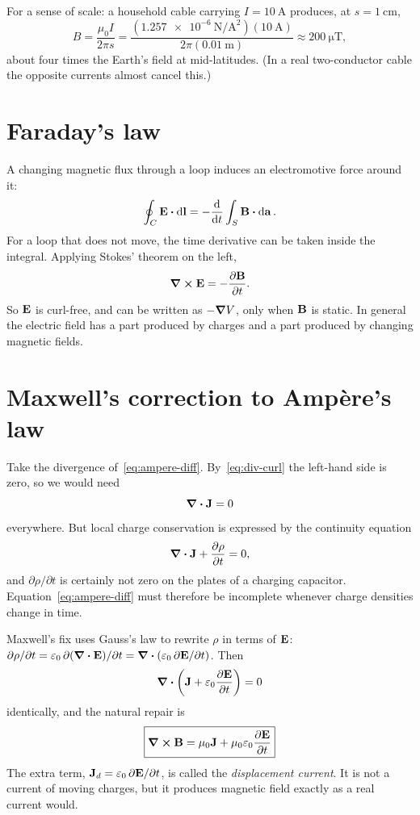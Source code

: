 \documentclass[11pt,a4paper]{article}
\theoremstyle{definition}
\theoremstyle{remark}
\newcommand{\E}{\vb{E}}
\newcommand{\B}{\vb{B}}
\newcommand{\J}{\vb{J}}
\newcommand{\eps}{\varepsilon_0}
\begin{document}
For a sense of scale: a household cable carrying $I = \SI{10}{\ampere}$ produces, at $s = \SI{1}{\centi\metre}$,
\[
  B = \frac{\mu_0 I}{2\pi s} = \frac{(\SI{1.257e-6}{\newton\per\ampere\squared})(\SI{10}{\ampere})}{2\pi(\SI{0.01}{\metre})} \approx \SI{200}{\micro\tesla},
\]
about four times the Earth's field at mid-latitudes. (In a real two-conductor cable the opposite currents almost cancel this.)

\section{Faraday's law}
\label{sec:faraday}

A changing magnetic flux through a loop induces an electromotive force around it:
\begin{equation}\label{eq:faraday-integral}
  \oint_C \E\vdot\dd{\vb{l}} = -\dv{t}\int_S \B\vdot\dd{\vb{a}}.
\end{equation}
For a loop that does not move, the time derivative can be taken inside the integral. Applying Stokes' theorem on the left,
\begin{equation}\label{eq:faraday-diff}
  \curl{\E} = -\pdv{\B}{t}.
\end{equation}
So $\E$ is curl-free, and can be written as $-\grad{V}$, only when $\B$ is static. In general the electric field has a part produced by charges and a part produced by changing magnetic fields.

\section{Maxwell's correction to Ampère's law}
\label{sec:displacement}

Take the divergence of~\eqref{eq:ampere-diff}. By~\eqref{eq:div-curl} the left-hand side is zero, so we would need
\[
  \div{\J} = 0
\]
everywhere. But local charge conservation is expressed by the continuity equation
\begin{equation}\label{eq:continuity}
  \div{\J} + \pdv{\rho}{t} = 0,
\end{equation}
and $\partial\rho/\partial t$ is certainly not zero on the plates of a charging capacitor. Equation~\eqref{eq:ampere-diff} must therefore be incomplete whenever charge densities change in time.

Maxwell's fix uses Gauss's law to rewrite $\rho$ in terms of $\E$: $\partial\rho/\partial t = \eps\,\partial(\div{\E})/\partial t = \div(\eps\,\partial\E/\partial t)$. Then
\[
  \div\qty(\J + \eps\pdv{\E}{t}) = 0
\]
identically, and the natural repair is
\begin{equation}\label{eq:ampere-maxwell}
  \boxed{\curl{\B} = \mu_0\J + \mu_0\eps\pdv{\E}{t}}
\end{equation}
The extra term, $\J_d = \eps\,\partial\E/\partial t$, is called the \emph{displacement current}. It is not a current of moving charges, but it produces magnetic field exactly as a real current would.
\end{document}
